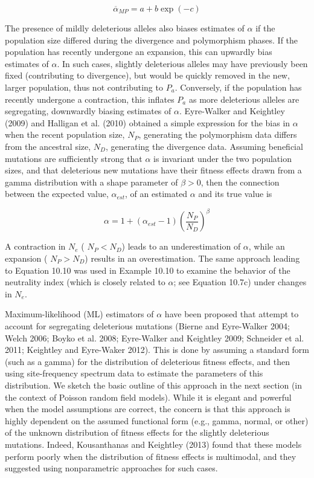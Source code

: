 \documentclass{article}
\begin{document}
\begin{equation}
\overline{\alpha}_{MP}=a+b\exp(-c)
\tag{10.9d}
\label{eq:10_9d}
\end{equation}

The presence of mildly deleterious alleles also biases estimates of  $ \alpha $ if the population size differed during the divergence and polymorphism phases. If the population has recently undergone an expansion, this can upwardly bias estimates of  $ \alpha $. In such cases, slightly deleterious alleles may have previously been fixed (contributing to divergence), but would be quickly removed in the new, larger population, thus not contributing to  $ P_a $. Conversely, if the population has recently undergone a contraction, this inflates  $ P_a $ as more deleterious alleles are segregating, downwardly biasing estimates of  $ \alpha $. Eyre-Walker and Keightley (2009) and Halligan et al. (2010) obtained a simple expression for the bias in  $ \alpha $ when the recent population size,  $ N_P $, generating the polymorphism data differs from the ancestral size,  $ N_D $, generating the divergence data. Assuming beneficial mutations are sufficiently strong that  $ \alpha $ is invariant under the two population sizes, and that deleterious new mutations have their fitness effects drawn from a gamma distribution with a shape parameter of  $ \beta > 0 $, then the connection between the expected value,  $ \alpha_{est} $, of an estimated  $ \alpha $ and its true value is

\begin{equation}
\alpha=1+\left(\alpha_{est}-1\right)\left(\frac{N_{P}}{N_{D}}\right)^{\beta}
\tag{10.10}
\label{eq:10_10}
\end{equation}

A contraction in  $ N_e $ ( $ N_P < N_D $) leads to an underestimation of  $ \alpha $, while an expansion ( $ N_P > N_D $) results in an overestimation. The same approach leading to Equation 10.10 was used in Example 10.10 to examine the behavior of the neutrality index (which is closely related to  $ \alpha $; see Equation 10.7c) under changes in  $ N_e $.

Maximum-likelihood (ML) estimators of  $ \alpha $ have been proposed that attempt to account for segregating deleterious mutations (Bierne and Eyre-Walker 2004; Welch 2006; Boyko et al. 2008; Eyre-Walker and Keightley 2009; Schneider et al. 2011; Keightley and Eyre-Waker 2012). This is done by assuming a standard form (such as a gamma) for the distribution of deleterious fitness effects, and then using site-frequency spectrum data to estimate the parameters of this distribution. We sketch the basic outline of this approach in the next section (in the context of Poisson random field models). While it is elegant and powerful when the model assumptions are correct, the concern is that this approach is highly dependent on the assumed functional form (e.g., gamma, normal, or other) of the unknown distribution of fitness effects for the slightly deleterious mutations. Indeed, Kousanthanas and Keightley (2013) found that these models perform poorly when the distribution of fitness effects is multimodal, and they suggested using nonparametric approaches for such cases.
\end{document}
